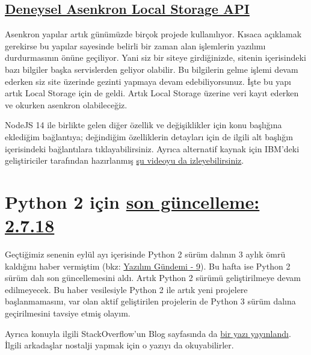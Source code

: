 \documentclass[11pt]{article}
\begin{document}
\subsection{\href{https://nodejs.org/api/async\_hooks.html\#async\_hooks\_class\_asynclocalstorage}{Deneysel Asenkron Local Storage API}}
\label{sec:orgb69f7f7}
Asenkron yapılar artık günümüzde birçok projede kullanılıyor. Kısaca
açıklamak gerekirse bu yapılar sayesinde belirli bir zaman alan işlemlerin
yazılımı durdurmasının önüne geçiliyor. Yani siz bir siteye girdiğinizde,
sitenin içerisindeki bazı bilgiler başka servislerden geliyor olabilir. Bu
bilgilerin gelme işlemi devam ederken siz site üzerinde gezinti yapmaya devam
edebiliyorsunuz. İşte bu yapı artık Local Storage için de geldi. Artık Local
Storage üzerine veri kayıt ederken ve okurken asenkron olabileceğiz.


NodeJS 14 ile birlikte gelen diğer özellik ve değişiklikler için konu
başlığına eklediğim bağlantıya; değindiğim özelliklerin detayları için de
ilgili alt başlığın içerisindeki bağlantılara tıklayabilirsiniz. Ayrıca
alternatif kaynak için IBM'deki geliştiriciler tarafından hazırlanmış \href{https://www.youtube.com/watch?v=2iIJhi6\_ngo}{şu
videoyu da izleyebilirsiniz}.
\section{Python 2 için \href{https://www.python.org/downloads/release/python-2718/}{son güncelleme: 2.7.18}}
\label{sec:org25a1836}
Geçtiğimiz senenin eylül ayı içerisinde Python 2 sürüm dalının 3 aylık ömrü
kaldığını haber vermiştim (bkz: \href{../../2019/yazilim-gundemi-09.pdf}{Yazılım Gündemi - 9}). Bu hafta ise Python 2
sürüm dalı son güncellemesini aldı. Artık Python 2 sürümü geliştirilmeye devam
edilmeyecek. Bu haber vesilesiyle Python 2 ile artık yeni projelere
başlanmamasını, var olan aktif geliştirilen projelerin de Python 3 sürüm
dalına geçirilmesini tavsiye etmiş olayım.

Ayrıca konuyla ilgili StackOverflow'un Blog sayfasında da \href{https://stackoverflow.blog/2020/04/23/the-final-python-2-release-marks-the-end-of-an-era/}{bir yazı yayınlandı}.
İlgili arkadaşlar nostalji yapmak için o yazıyı da okuyabilirler.
\newpage
\end{document}
